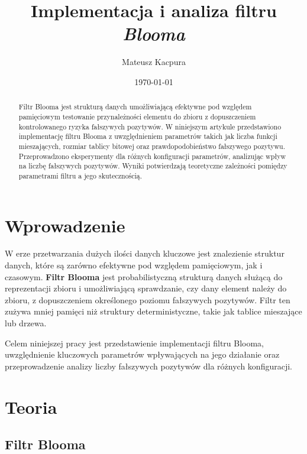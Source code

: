 \documentclass{article}
\begin{document}
\title{Implementacja i analiza filtru \textit{Blooma}}
\author{Mateusz Kacpura}
\date{\today}

\maketitle

\begin{abstract}
Filtr Blooma jest strukturą danych umożliwiającą efektywne pod względem pamięciowym testowanie przynależności elementu do zbioru z dopuszczeniem kontrolowanego ryzyka fałszywych pozytywów. W niniejszym artykule przedstawiono implementację filtru Blooma z uwzględnieniem parametrów takich jak liczba funkcji mieszających, rozmiar tablicy bitowej oraz prawdopodobieństwo fałszywego pozytywu. Przeprowadzono eksperymenty dla różnych konfiguracji parametrów, analizując wpływ na liczbę fałszywych pozytywów. Wyniki potwierdzają teoretyczne zależności pomiędzy parametrami filtru a jego skutecznością.
\end{abstract}

\tableofcontents

\newpage

\section{Wprowadzenie}

W erze przetwarzania dużych ilości danych kluczowe jest znalezienie struktur danych, które są zarówno efektywne pod względem pamięciowym, jak i czasowym. \textbf{Filtr Blooma} \cite{bloom1970} jest probabilistyczną strukturą danych służącą do reprezentacji zbioru i umożliwiającą sprawdzanie, czy dany element należy do zbioru, z dopuszczeniem określonego poziomu fałszywych pozytywów. Filtr ten zużywa mniej pamięci niż struktury deterministyczne, takie jak tablice mieszające lub drzewa.

Celem niniejszej pracy jest przedstawienie implementacji filtru Blooma, uwzględnienie kluczowych parametrów wpływających na jego działanie oraz przeprowadzenie analizy liczby fałszywych pozytywów dla różnych konfiguracji.

\section{Teoria}

\subsection{Filtr Blooma}
\end{document}
